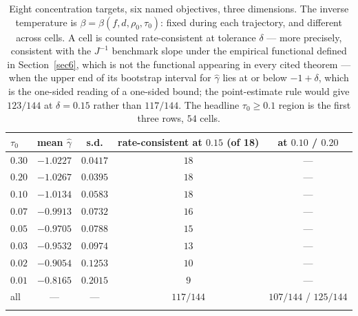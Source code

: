 \documentclass[pdflatex,sn-mathphys-num]{sn-jnl}
\theoremstyle{thmstyleone}
\theoremstyle{thmstyletwo}
\theoremstyle{thmstylethree}
\begin{document}
\begin{table}[h]
\caption{Eight concentration targets, six named objectives, three dimensions. The inverse temperature is $\beta=\beta(f,d,\rho_0,\tau_0)$: fixed during each trajectory, and different across cells. A cell is counted rate-consistent at tolerance $\delta$ --- more precisely, consistent with the $J^{-1}$ benchmark slope under the empirical functional defined in Section~\ref{sec6}, which is not the functional appearing in every cited theorem --- when the upper end of its bootstrap interval for $\hat\gamma$ lies at or below $-1+\delta$, which is the one-sided reading of a one-sided bound; the point-estimate rule would give $123/144$ at $\delta=0.15$ rather than $117/144$. The headline $\tau_0\ge0.1$ region is the first three rows, $54$ cells.}\label{tab:boundary}
\begin{tabular}{@{}lcccc@{}}
\toprule
$\tau_0$ & mean $\hat\gamma$ & s.d. & rate-consistent at $0.15$ (of 18) & at $0.10$ / $0.20$\\
\midrule
$0.30$ & $-1.0227$ & $0.0417$ & $18$ & --- \\
$0.20$ & $-1.0267$ & $0.0395$ & $18$ & --- \\
$0.10$ & $-1.0134$ & $0.0583$ & $18$ & --- \\
$0.07$ & $-0.9913$ & $0.0732$ & $16$ & --- \\
$0.05$ & $-0.9705$ & $0.0788$ & $15$ & --- \\
$0.03$ & $-0.9532$ & $0.0974$ & $13$ & --- \\
$0.02$ & $-0.9054$ & $0.1253$ & $10$ & --- \\
$0.01$ & $-0.8165$ & $0.2015$ & $9$ & --- \\
\midrule
all & --- & --- & $117/144$ & $107/144$ / $125/144$\\
\botrule
\end{tabular}
\end{table}
\end{document}
